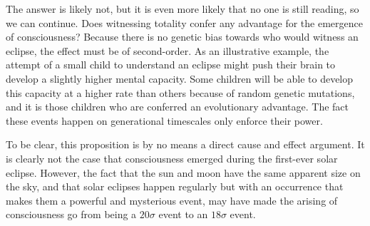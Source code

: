 \begin{appendices}
The answer is likely not, but it is even more likely that no one is still reading, so we can continue. Does witnessing totality confer any advantage for the emergence of consciousness? Because there is no genetic bias towards who would witness an eclipse, the effect must be of second-order. As an illustrative example, the attempt of a small child to understand an eclipse might push their brain to develop a slightly higher mental capacity. Some children will be able to develop this capacity at a higher rate than others because of random genetic mutations, and it is those children who are conferred an evolutionary advantage. The fact these events happen on generational timescales only enforce their power.

To be clear, this proposition is by no means a direct cause and effect argument. It is clearly not the case that consciousness emerged during the first-ever solar eclipse. However, the fact that the sun and moon have the same apparent size on the sky, and that solar eclipses happen regularly but with an occurrence that makes them a powerful and mysterious event, may have made the arising of consciousness go from being a $20\sigma$ event to an $18\sigma$ event.

\end{appendices}
